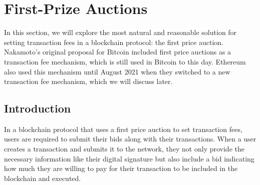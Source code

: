 \section{First-Prize Auctions}
In this section, we will explore the most natural and reasonable solution for setting transaction fees in a blockchain protocol: the first price auction. Nakamoto's original proposal for Bitcoin included first price auctions as a transaction fee mechanism, which is still used in Bitcoin to this day. Ethereum also used this mechanism until August 2021 when they switched to a new transaction fee mechanism, which we will discuss later.

\subsection{Introduction}
In a blockchain protocol that uses a first price auction to set transaction fees, users are required to submit their bids along with their transactions. When a user creates a transaction and submits it to the network, they not only provide the necessary information like their digital signature but also include a bid indicating how much they are willing to pay for their transaction to be included in the blockchain and executed.

